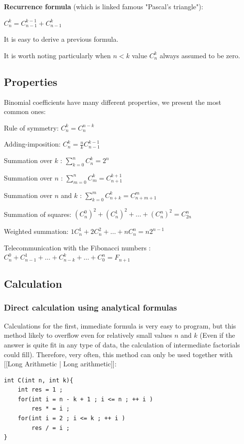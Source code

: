 \textbf{Recurrence formula} (which is linked famous "Pascal's triangle"):

$C_n ^ k = C_ {n-1} ^ {k-1} + C_ {n-1} ^ k$

It is easy to derive a previous formula.

It is worth noting particularly when $n <k$ value $C_n ^ k$ always assumed to be zero.

\subsection{ Properties }

Binomial coefficients have many different properties, we present the most common ones:

Rule of symmetry:
$C_n ^ k = C_n ^ {n-k}$

Adding-imposition:
$C_n ^ k = \frac {n} {k} C_ {n-1} ^ {k-1}$

Summation over $k$ :
$\sum_ {k = 0} ^ n C_n ^ k = 2 ^ n$

Summation over $n$ :
$\sum_ {m = 0} ^ n C_m ^ k = C_ {n +1} ^ {k +1}$

Summation over $n$ and $k$ :
$\sum_ {k = 0} ^ {m} C_ {n + k} ^ k = C_ {n + m +1} ^ m$

Summation of squares:
$(C_{n}^{0})^{2}+(C_{n}^{1})^{2}+\ldots+(C_{n}^{n})^{2}=C_{2n}^{n}$

Weighted summation:
$1 C_n ^ 1 + 2 C_n ^ 2 + \ldots + n C_n ^ n = n 2 ^ {n-1}$

Telecommunication with the Fibonacci numbers :
$C_{n}^{0}+C_{n-1}^{1}+\ldots+C_{n-k}^{k}+\ldots+C_{0}^{n}=F_{n+1}$

\subsection{ Calculation }

\subsubsection{ Direct calculation using analytical formulas }

Calculations for the first, immediate formula is very easy to program, but this method likely to overflow even for relatively small values $n$ and $k$ (Even if the answer is quite fit in any type of data, the calculation of intermediate factorials could fill). Therefore, very often, this method can only be used together with [[Long Arithmetic | Long arithmetic]]:

\begin{verbatim}
int C(int n, int k){
    int res = 1 ;
    for(int i = n - k + 1 ; i <= n ; ++ i )
        res * = i ;
    for(int i = 2 ; i <= k ; ++ i )
        res / = i ;
} 
\end{verbatim}
